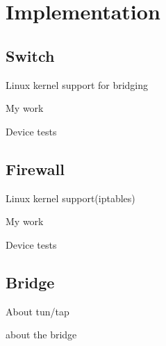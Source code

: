 \chapter{Implementation}
\label{chapter:impl}

\section{Switch}
\label{sub-sec:switch-impl}

Linux kernel support for bridging

My work

Device tests

\lstset{language=C, caption=Add bridge}


\section{Firewall}
\label{sub-sec:firewall-impl}

Linux kernel support(iptables)

My work

Device tests

\section{Bridge}

About tun/tap

about the bridge
